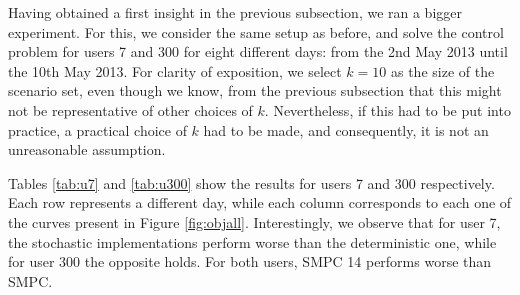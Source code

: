\documentclass[11pt]{article}
\theoremstyle{definition}
\begin{document}
Having obtained a first insight in the previous subsection, we ran a bigger experiment. For this, we consider the same setup as before, and solve the control problem for users 7 and 300 for eight different days: from the 2nd May 2013 until the 10th May 2013. 
For clarity of exposition, we select $k=10$ as the size of the scenario set, even though we know, from the previous subsection that this might not be representative of other choices of $k$. Nevertheless, if this had to be put into practice, a practical choice of $k$ had to be made, and consequently, it is not an unreasonable assumption.

Tables \ref{tab:u7} and \ref{tab:u300} show the results for users 7 and 300 respectively. Each row represents a different day, while each column corresponds to each one of the curves present in Figure \ref{fig:objall}.
Interestingly, we observe that for user 7, the stochastic implementations perform worse than the deterministic one, while for user 300 the opposite holds. For both users, SMPC 14 performs worse than SMPC.

%
\end{document}
